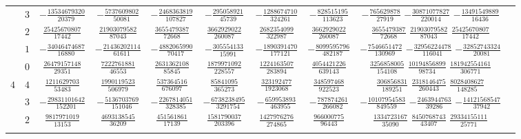 \begin{table}
\begin{center}
\begin{tabular}{cccccccccc}
           &  $3$  &  $-\frac{ 13534679320}{  20379}$  &  $-\frac{  5737609802}{  50081}$  &  $-\frac{ 2468363819}{  107827}$  &  $-\frac{ 295058921}{   45739}$  &  $-\frac{1288674710}{  324261}$  &  $-\frac{ 828515195}{  113623}$  &  $-\frac{  765629878}{   27919}$  $-\frac{ 30871077827}{ 220014}$  $-\frac{ 13491549889}{  16436}$  \\ \addlinespace
           &  $2$  &  $ \frac{ 25425670807}{  17442}$  &  $ \frac{ 21903079582}{  87043}$  &  $ \frac{ 3655479387}{   72668}$  &  $ \frac{3662929022}{  260087}$  &  $ \frac{2682354099}{  322987}$  &  $ \frac{3662929022}{  260087}$  &  $ \frac{ 3655479387}{   72668}$  $ \frac{ 21903079582}{  87043}$  $ \frac{ 25425670807}{  17442}$  \\ \addlinespace
           &  $1$  &  $-\frac{ 34046474687}{  16880}$  &  $-\frac{ 21436202114}{  61611}$  &  $-\frac{ 4882065990}{   70417}$  &  $-\frac{ 305554133}{   15991}$  &  $-\frac{1890391470}{  177121}$  &  $-\frac{8099595796}{  482187}$  &  $-\frac{ 7546651472}{  130969}$  $-\frac{ 32956224478}{ 116041}$  $-\frac{ 32852743324}{  20081}$  \\ \addlinespace
           &  $0$  &  $ \frac{ 26479157148}{  29351}$  &  $ \frac{  7222761881}{  46553}$  &  $ \frac{ 2631362108}{   85845}$  &  $ \frac{1879971092}{  228557}$  &  $ \frac{1224163507}{  283894}$  &  $ \frac{4054421226}{  639143}$  &  $ \frac{ 3256858005}{  154108}$  $ \frac{ 10194856899}{  98734}$  $ \frac{181942554161}{ 306771}$  \\ \addlinespace
      $4$  &  $4$  &  $ \frac{  1211629703}{  53483}$  &  $ \frac{  1990119523}{ 506979}$  &  $ \frac{  537364516}{  676097}$  &  $ \frac{  85841095}{  365273}$  &  $ \frac{ 323192477}{ 1923068}$  &  $ \frac{ 348597468}{  922523}$  &  $ \frac{  306856831}{  189251}$  $ \frac{  2318146475}{ 260443}$  $ \frac{  8028408627}{ 148285}$  \\ \addlinespace
           &  $3$  &  $-\frac{ 29831101642}{ 152201}$  &  $-\frac{  5136703769}{ 151046}$  &  $-\frac{ 2267814051}{  328385}$  &  $-\frac{6738238495}{ 3291754}$  &  $-\frac{ 659953893}{  463955}$  &  $-\frac{ 787874261}{  266082}$  &  $-\frac{10107954583}{  849559}$  $-\frac{  2463944763}{  39286}$  $-\frac{ 14121568547}{  37942}$  \\ \addlinespace
           &  $2$  &  $ \frac{  9817971019}{  13153}$  &  $ \frac{  4693138545}{  36209}$  &  $ \frac{  451561861}{   17139}$  &  $ \frac{1581790037}{  203396}$  &  $ \frac{1427976276}{  274865}$  &  $ \frac{ 966000775}{   96443}$  &  $ \frac{ 1334723167}{   35090}$  $ \frac{  8450768743}{  43407}$  $ \frac{ 29334155111}{  25771}$  \\ \addlinespace

\end{tabular}
\end{center}
\end{table}
